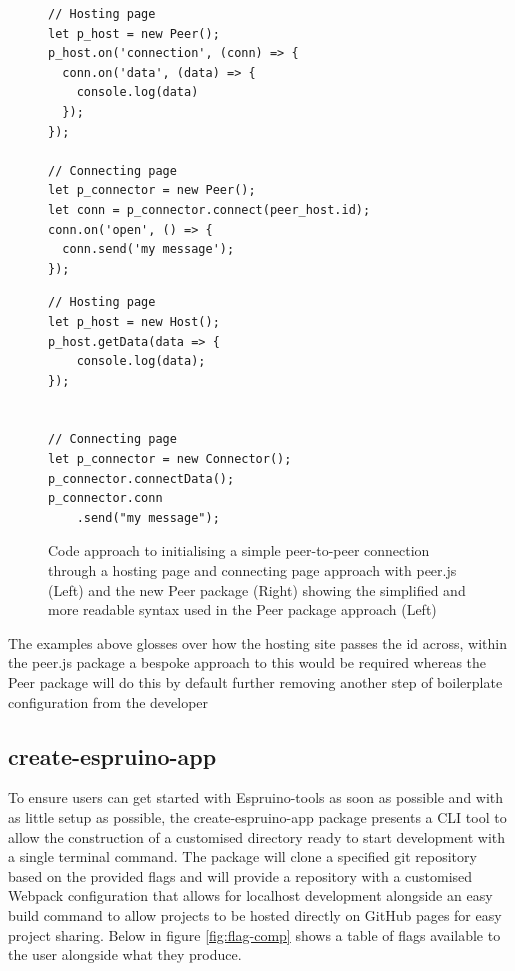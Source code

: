 \documentclass{l4proj}
\begin{document}
\begin{figure}[!ht]
\centering
\begin{minipage}{7cm}
  \centering
  \begin{lstlisting}
// Hosting page
let p_host = new Peer();
p_host.on('connection', (conn) => {
  conn.on('data', (data) => {
    console.log(data)
  });
});

// Connecting page
let p_connector = new Peer();
let conn = p_connector.connect(peer_host.id);
conn.on('open', () => {
  conn.send('my message');
});
  \end{lstlisting}
\end{minipage}
\hspace{1cm}
\begin{minipage}{5.5cm}
  \centering
  
  \begin{lstlisting}
// Hosting page
let p_host = new Host();
p_host.getData(data => {
    console.log(data);
});
 

// Connecting page
let p_connector = new Connector();
p_connector.connectData();
p_connector.conn
    .send("my message");

  \end{lstlisting}

\end{minipage}
  \caption{Code approach to initialising a simple peer-to-peer connection through a hosting page and connecting page approach with peer.js (Left) and the new Peer package (Right) showing the simplified and more readable syntax used in the Peer package approach (Left)}
  \label{fig:peer-syntax}
\end{figure}

The examples above glosses over how the hosting site passes the id across, within the peer.js package a bespoke approach to this would be required whereas the Peer package will do this by default further removing another step of boilerplate configuration from the developer


\subsection{create-espruino-app}
To ensure users can get started with Espruino-tools as soon as possible and with as little setup as possible, the create-espruino-app package presents a CLI tool to allow the construction of a customised directory ready to start development with a single terminal command. The package will clone a specified git repository based on the provided flags and will provide a repository with a customised Webpack configuration that allows for localhost development alongside an easy build command to allow projects to be hosted directly on GitHub pages for easy project sharing. Below in figure \ref{fig:flag-comp} shows a table of flags available to the user alongside what they produce.
\end{document}

